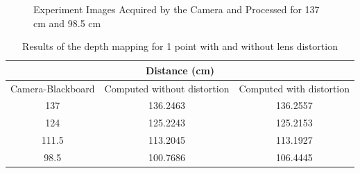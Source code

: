 \begin{figure}[!h]
{  \label{fig:exp1Point137}
}
\quad 
{}
\caption{Experiment Images Acquired by the Camera and Processed for 137 cm and 98.5 cm} 
\end{figure}

\begin{table}[H]
\centering
\caption{Results of the depth mapping for 1 point with and without lens distortion}
\label{results1Point}
\renewcommand{\arraystretch}{1.5}
\begin{tabular}{|c|c|c|}
\hline
\multicolumn{3}{|c|}{Distance (cm)} \\ \hline
Camera-Blackboard & Computed without distortion & Computed with distortion \\ \hline
137 & 136.2463 & 136.2557 \\ \hline
124 & 125.2243 & 125.2153 \\ \hline
111.5 & 113.2045 & 113.1927 \\ \hline
98.5 & 100.7686 & 106.4445 \\ \hline
\end{tabular}
\end{table}

